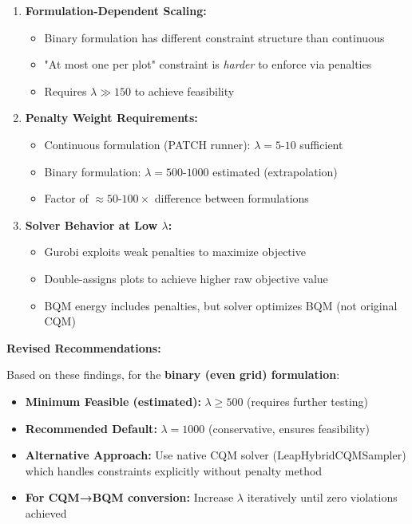 \documentclass{article}
\begin{document}
\begin{enumerate}
    \item \textbf{Formulation-Dependent Scaling:}
    \begin{itemize}
        \item Binary formulation has different constraint structure than continuous
        \item "At most one per plot" constraint is \textit{harder} to enforce via penalties
        \item Requires $\lambda \gg 150$ to achieve feasibility
    \end{itemize}
    
    \item \textbf{Penalty Weight Requirements:}
    \begin{itemize}
        \item Continuous formulation (PATCH runner): $\lambda = 5$-$10$ sufficient
        \item Binary formulation: $\lambda = 500$-$1000$ estimated (extrapolation)
        \item Factor of $\approx 50$-$100\times$ difference between formulations
    \end{itemize}
    
    \item \textbf{Solver Behavior at Low $\lambda$:}
    \begin{itemize}
        \item Gurobi exploits weak penalties to maximize objective
        \item Double-assigns plots to achieve higher raw objective value
        \item BQM energy includes penalties, but solver optimizes BQM (not original CQM)
    \end{itemize}
\end{enumerate}

\textbf{Revised Recommendations:}

Based on these findings, for the \textbf{binary (even grid) formulation}:

\begin{itemize}
    \item \textbf{Minimum Feasible (estimated):} $\lambda \geq 500$ (requires further testing)
    \item \textbf{Recommended Default:} $\lambda = 1000$ (conservative, ensures feasibility)
    \item \textbf{Alternative Approach:} Use native CQM solver (LeapHybridCQMSampler) which handles constraints explicitly without penalty method
    \item \textbf{For CQM→BQM conversion:} Increase $\lambda$ iteratively until zero violations achieved
\end{itemize}
\end{document}
